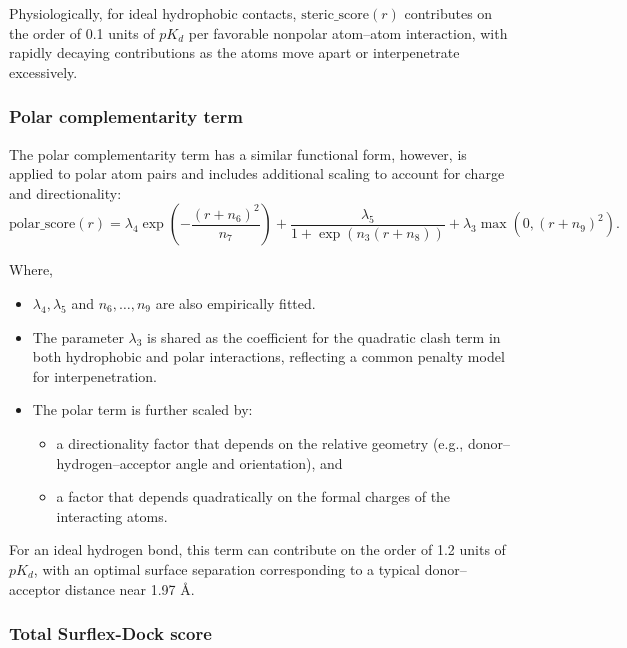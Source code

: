 \documentclass[12pt, a4paper]{article}
\begin{document}
Physiologically, for ideal hydrophobic contacts, $\text{steric\_score}(r)$ contributes on the order of 0.1 units of $pK_d$ per favorable nonpolar atom--atom interaction, with rapidly decaying contributions as the atoms move apart or interpenetrate excessively.\cite{CH7_Jain2007Surflex21}

\subsubsection{Polar complementarity term}

The polar complementarity term\cite{CH7_Jain2007Surflex21} has a similar functional form, however, is applied to polar atom pairs and includes additional scaling to account for charge and directionality:
\begin{equation}
  \text{polar\_score}(r)
  =
  \lambda_{4} \exp\!\left(
    -\frac{\left(r + n_{6}\right)^{2}}{n_{7}}
  \right)
  +
  \frac{\lambda_{5}}{
    1 + \exp\!\left(
      n_{3} \left( r + n_{8} \right)
    \right)
  }
  +
  \lambda_{3} \max\!\left( 0,\left( r + n_{9} \right)^{2} \right).
  \label{eq:polar}
\end{equation}

Where,
\begin{itemize}
  \item $\lambda_{4}, \lambda_{5}$ and $n_{6}, \dots, n_{9}$ are also empirically fitted.
  \item The parameter $\lambda_{3}$ is shared as the coefficient for the quadratic clash term in both hydrophobic and polar interactions, reflecting a common penalty model for interpenetration.
  \item The polar term is further scaled by:
  \begin{itemize}
    \item a directionality factor that depends on the relative geometry (e.g., donor--hydrogen--acceptor angle and orientation), and
    \item a factor that depends quadratically on the formal charges of the interacting atoms.
  \end{itemize}
\end{itemize}

For an ideal hydrogen bond, this term can contribute on the order of 1.2 units of \(pK_d\), with an optimal surface separation corresponding to a typical donor--acceptor distance near 1.97 \r{A}.\cite{CH7_Jain2007Surflex21}

\subsubsection{Total Surflex-Dock score}
\end{document}

